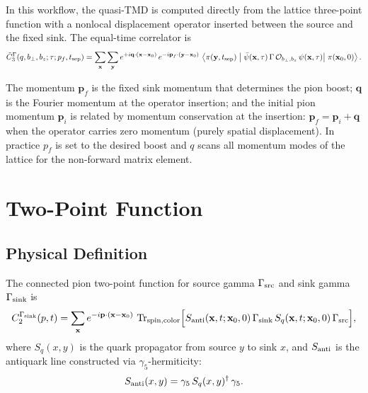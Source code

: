 \documentclass[11pt,a4paper]{article}
\begin{document}
In this workflow, the quasi-TMD is computed directly from the lattice
three-point function with a nonlocal displacement operator inserted between the
source and the fixed sink.  The equal-time correlator is
\begin{equation}
  \tilde C_3^{\Gamma}(q, b_\perp, b_z; \tau; p_f, t_{\rm sep})
  =
  \sum_{\mathbf{x}}\sum_{\mathbf{y}}
  e^{+i\mathbf{q}\cdot(\mathbf{x}-\mathbf{x}_0)}\,
  e^{-i\mathbf{p}_f\cdot(\mathbf{y}-\mathbf{x}_0)}\,
  \Braket{
    \pi(\mathbf{y}, t_{\rm sep})\;
    \big|\;
    \bar\psi(\mathbf{x},\tau)\,\Gamma\,
    \mathcal{O}_{b_\perp,b_z}\,\psi(\mathbf{x},\tau)
    \big|\;
    \pi(\mathbf{x}_0, 0)
  }.
\end{equation}

The momentum $\mathbf{p}_f$ is the fixed sink momentum that determines the pion
boost; $\mathbf{q}$ is the Fourier momentum at the operator insertion; and the
initial pion momentum $\mathbf{p}_i$ is related by momentum conservation at the
insertion: $\mathbf{p}_f = \mathbf{p}_i + \mathbf{q}$ when the operator carries
zero momentum (purely spatial displacement).  In practice $p_f$ is set to the
desired boost and $q$ scans all momentum modes of the lattice for the
non-forward matrix element.

\section{Two-Point Function}
\label{sec:twopt}

\subsection{Physical Definition}

The connected pion two-point function for source gamma $\Gamma_{\rm src}$ and
sink gamma $\Gamma_{\rm sink}$ is
\begin{equation}
  C_2^{\Gamma_{\rm sink}}(p, t)
  =
  \sum_{\mathbf{x}}
  e^{-i\mathbf{p}\cdot(\mathbf{x}-\mathbf{x}_0)}\,
  \Tr_{\rm spin, color}\!\Big[
    S_{\rm anti}(\mathbf{x},t; \mathbf{x}_0,0)\,
    \Gamma_{\rm sink}\,
    S_q(\mathbf{x},t; \mathbf{x}_0,0)\,
    \Gamma_{\rm src}
  \Big],
  \label{eq:c2}
\end{equation}
where $S_q(x,y)$ is the quark propagator from source $y$ to sink $x$, and
$S_{\rm anti}$ is the antiquark line constructed via $\gamma_5$-hermiticity:
\begin{equation}
  S_{\rm anti}(x,y) = \gamma_5\, S_q(x,y)^\dagger\, \gamma_5.
\end{equation}
\end{document}
